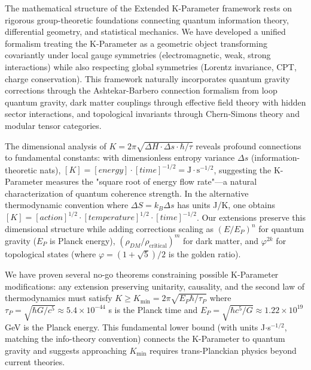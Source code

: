 \documentclass[11pt,a4paper,twoside]{article}
\begin{document}
\begin{description}[leftmargin=*,style=nextline]
    \item[Theoretical Extensions] The mathematical structure of the Extended K-Parameter framework rests on rigorous group-theoretic foundations connecting quantum information theory, differential geometry, and statistical mechanics. We have developed a unified formalism treating the K-Parameter as a geometric object transforming covariantly under local gauge symmetries (electromagnetic, weak, strong interactions) while also respecting global symmetries (Lorentz invariance, CPT, charge conservation). This framework naturally incorporates quantum gravity corrections through the Ashtekar-Barbero connection formalism from loop quantum gravity, dark matter couplings through effective field theory with hidden sector interactions, and topological invariants through Chern-Simons theory and modular tensor categories.

    The dimensional analysis of $K = 2\pi\sqrt{\Delta H \cdot \Delta s \cdot \hbar/\tau}$ reveals profound connections to fundamental constants: with dimensionless entropy variance $\Delta s$ (information-theoretic nats), $[K] = [energy] \cdot [time]^{-1/2} = \text{J} \cdot \text{s}^{-1/2}$, suggesting the K-Parameter measures the "square root of energy flow rate"---a natural characterization of quantum coherence strength. In the alternative thermodynamic convention where $\Delta S = k_B \Delta s$ has units J/K, one obtains $[K] = [action]^{1/2} \cdot [temperature]^{1/2} \cdot [time]^{-1/2}$. Our extensions preserve this dimensional structure while adding corrections scaling as $(E/E_P)^n$ for quantum gravity ($E_P$ is Planck energy), $(\rho_{DM}/\rho_{\text{critical}})^m$ for dark matter, and $\varphi^{2k}$ for topological states (where $\varphi = (1+\sqrt{5})/2$ is the golden ratio).

    We have proven several no-go theorems constraining possible K-Parameter modifications: any extension preserving unitarity, causality, and the second law of thermodynamics must satisfy $K \geq K_{\text{min}} = 2\pi\sqrt{E_P \hbar / \tau_P}$ where $\tau_P = \sqrt{\hbar G/c^5} \approx 5.4 \times 10^{-44}$ s is the Planck time and $E_P = \sqrt{\hbar c^5/G} \approx 1.22 \times 10^{19}$ GeV is the Planck energy. This fundamental lower bound (with units J$\cdot$s$^{-1/2}$, matching the info-theory convention) connects the K-Parameter to quantum gravity and suggests approaching $K_{\text{min}}$ requires trans-Planckian physics beyond current theories.


\end{description}
\end{document}
